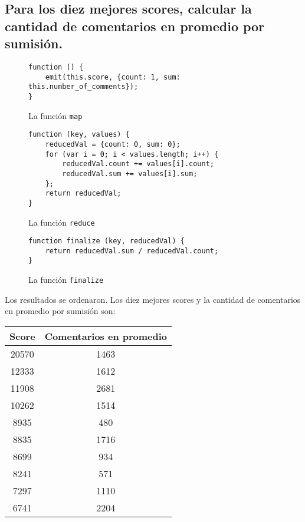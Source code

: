 \documentclass[11pt, a4paper, twoside]{article}
\begin{document}
\newpage
\subsection{Para los diez mejores scores, calcular la cantidad de comentarios en promedio por sumisión.}

\begin{figure}[H]
\centering
\begin{verbatim}
function () {
    emit(this.score, {count: 1, sum: this.number_of_comments});
}
\end{verbatim}
\caption{La función \texttt{map}}
\end{figure}

\begin{figure}[H]
\centering
\begin{verbatim}
function (key, values) {
    reducedVal = {count: 0, sum: 0};
    for (var i = 0; i < values.length; i++) {
        reducedVal.count += values[i].count;
        reducedVal.sum += values[i].sum;
    };
    return reducedVal;
}
\end{verbatim}
\caption{La función \texttt{reduce}}
\end{figure}

\begin{figure}[H]
\centering
\begin{verbatim}
function finalize (key, reducedVal) {
    return reducedVal.sum / reducedVal.count;
}
\end{verbatim}
\caption{La función \texttt{finalize}}
\end{figure}

Los resultados se ordenaron. Los diez mejores scores y la cantidad de comentarios en promedio por sumisión son:

\begin{center}
  \begin{tabular}{c|c}
    \textbf{Score} & \textbf{Comentarios en promedio} \\ \hline
    20570 & 1463 \\
    12333 & 1612 \\
    11908 & 2681 \\
    10262 & 1514 \\
    8935 & 480 \\
    8835 & 1716 \\
    8699 & 934 \\
    8241 & 571 \\
    7297 & 1110 \\
    6741 & 2204
  \end{tabular}
\end{center}
\end{document}
